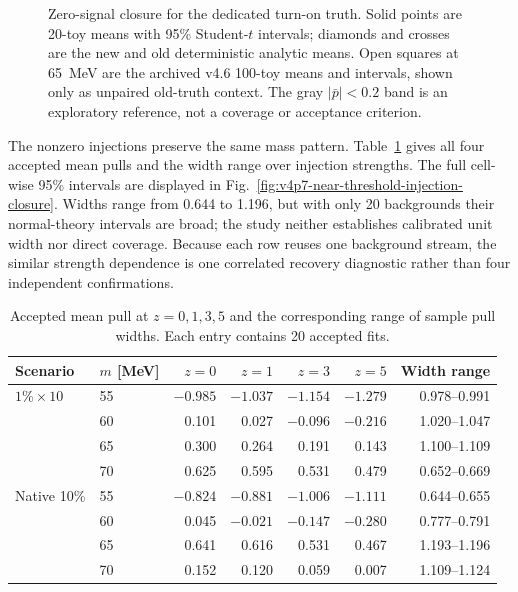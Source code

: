 \begin{figure}[p]
\centering
{}
\caption{Zero-signal closure for the dedicated turn-on truth.  Solid points
are 20-toy means with 95\% Student-$t$ intervals; diamonds and crosses are the
new and old deterministic analytic means.  Open squares at 65~MeV are the
archived v4.6 100-toy means and intervals, shown only as unpaired old-truth
context.  The gray $|\bar p|<0.2$ band is an exploratory reference, not a
coverage or acceptance criterion.}
\label{fig:v4p7-near-threshold-zero-signal}
\end{figure}

The nonzero injections preserve the same mass pattern.  Table~\ref{tab:v4p7-injection-means}
gives all four accepted mean pulls and the width range over injection
strengths.  The full cell-wise 95\% intervals are displayed in
Fig.~\ref{fig:v4p7-near-threshold-injection-closure}.  Widths range from 0.644
to 1.196, but with only 20 backgrounds their normal-theory intervals are
broad; the study neither establishes calibrated unit width nor direct
coverage.  Because each row reuses one background stream, the similar
strength dependence is one correlated recovery diagnostic rather than four
independent confirmations.

\begin{table}[htbp]
\centering
\caption{Accepted mean pull at $z=0,1,3,5$ and the corresponding range of
sample pull widths.  Each entry contains 20 accepted fits.}
\label{tab:v4p7-injection-means}
\small
\begin{tabular}{llrrrrr}
\toprule
Scenario & $m$ [MeV] & $z=0$ & $z=1$ & $z=3$ & $z=5$ & Width range \\
\midrule
$1\%\times10$ & 55 & $-0.985$ & $-1.037$ & $-1.154$ & $-1.279$ & 0.978--0.991 \\
                & 60 &  0.101 &  0.027 & $-0.096$ & $-0.216$ & 1.020--1.047 \\
                & 65 &  0.300 &  0.264 &  0.191 &  0.143 & 1.100--1.109 \\
                & 70 &  0.625 &  0.595 &  0.531 &  0.479 & 0.652--0.669 \\
Native 10\%     & 55 & $-0.824$ & $-0.881$ & $-1.006$ & $-1.111$ & 0.644--0.655 \\
                & 60 &  0.045 & $-0.021$ & $-0.147$ & $-0.280$ & 0.777--0.791 \\
                & 65 &  0.641 &  0.616 &  0.531 &  0.467 & 1.193--1.196 \\
                & 70 &  0.152 &  0.120 &  0.059 &  0.007 & 1.109--1.124 \\
\bottomrule
\end{tabular}
\end{table}

